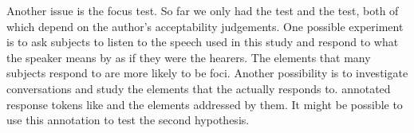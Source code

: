 Another issue is the focus test.
So far we only had the  test and the  test,
both of which depend on the author's acceptability judgements.
One possible experiment is to ask subjects to listen to the speech used in this study and respond to what the speaker means by  as if they were the hearers.
The elements that many subjects respond to are more likely to be foci. Another possibility is to investigate conversations and study the elements that the  actually responds to.  annotated response tokens like  and the elements addressed by them. It might be possible to use this annotation to test the second hypothesis.

